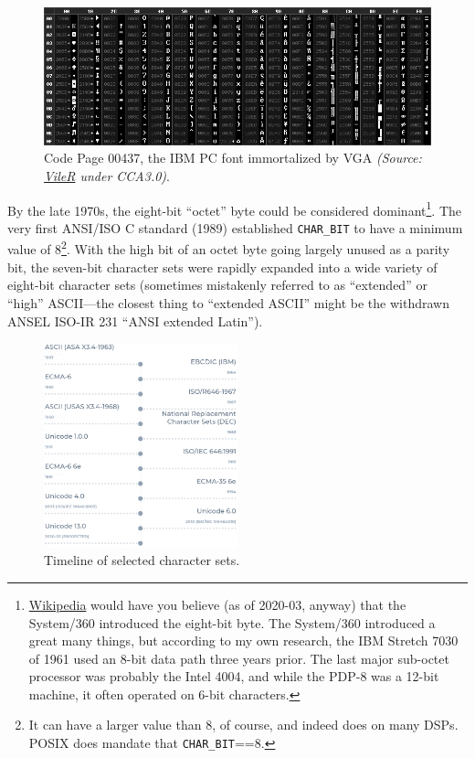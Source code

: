 \begin{figure}[!htb]
  \centering
  \includegraphics[width=.5\linewidth]{media/chart437.png}
  \caption[The legendary Code Page 00437.]{Code Page 00437, the IBM PC font immortalized by VGA \textit{(Source: \href{https://int10h.org/oldschool-pc-fonts/readme/}{VileR} under CCA3.0)}.}
  \label{fig:cp437}
\end{figure}

By the late 1970s, the eight-bit ``octet'' byte could be considered
dominant\footnote{\href{https://en.wikipedia.org/wiki/8-bit\_computing}{Wikipedia}
would have you believe (as of 2020-03, anyway) that the System/360 introduced
the eight-bit byte. The System/360 introduced a great many things, but
according to my own research, the IBM Stretch 7030 of 1961 used an 8-bit data
path three years prior\cite{ibmstretch}. The last major sub-octet processor
was probably the Intel 4004, and while the PDP-8 was a 12-bit machine, it
often operated on 6-bit characters.}. The very first ANSI/ISO C standard
(1989) established \texttt{CHAR\_BIT} to have a minimum value of 8\footnote{It
can have a larger value than 8, of course, and indeed does on many
DSPs\cite{cookcharbit}. POSIX does mandate that \texttt{CHAR\_BIT}==8.}. With
the high bit of an octet byte going largely unused as a parity bit, the
seven-bit character sets were rapidly expanded into a wide variety of eight-bit
character sets (sometimes mistakenly referred to as ``extended'' or ``high''
ASCII---the closest thing to ``extended ASCII'' might be the withdrawn ANSEL
ISO-IR 231 ``ANSI extended Latin''\cite{ansel}).

\begin{figure}
\centering
\includegraphics[width=0.5\textwidth]{media/charset-timeline.png}
\caption{Timeline of selected character sets.}
\label{fig:charset-timeline}
\end{figure}


